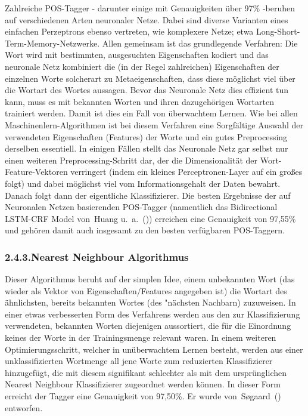 \documentclass{article}
\begin{document}
\noindent{}Zahlreiche POS-Tagger - darunter einige mit Genauigkeiten über 97\% -beruhen auf verschiedenen Arten neuronaler Netze. Dabei sind diverse Varianten eines einfachen Perzeptrons ebenso vertreten, wie komplexere Netze; etwa Long-Short-Term-Memory-Netzwerke.
Allen gemeinsam ist das grundlegende Verfahren: Die Wort wird mit bestimmten, ausgesuchten Eigenschaften kodiert und das neuronale Netz kombiniert die (in der Regel zahlreichen) Eigenschaften der einzelnen Worte solcherart zu Metaeigenschaften, dass diese möglichst viel über die Wortart des Wortes aussagen. Bevor das Neuronale Netz dies effizient tun kann, muss es mit bekannten Worten und ihren dazugehörigen Wortarten trainiert werden. Damit ist dies ein Fall von überwachtem Lernen.
Wie bei allen Maschinenlern-Algorithmen ist bei diesem Verfahren eine Sorgfältige Auswahl der verwendeten Eigenschaften (Features) der Worte und ein gutes Preprocessing derselben essentiell. In einigen Fällen stellt das Neuronale Netz gar selbst nur einen weiteren Preprocessing-Schritt dar, der die Dimensionalität der Wort-Feature-Vektoren verringert (indem ein kleines Perceptronen-Layer auf ein großes folgt) und dabei möglichst viel vom Informationsgehalt der Daten bewahrt. Danach folgt dann der eigentliche Klassifizierer.
Die besten Ergebnisse der auf Neuronalen Netzen basierenden POS-Tagger (namentlich das Bidirectional LSTM-CRF Model von~Huang u. a.~()) erreichen eine Genauigkeit von 97,55\% und gehören damit auch insgesamt zu den besten verfügbaren POS-Taggern.%

\subsubsection{2.4.3.\hspace*{0.5em}Nearest Neighbour Algorithmus}\label{sec-nearest-neighbour-algorithmus}%

\noindent{}Dieser Algorithmus beruht auf der simplen Idee, einem unbekannten Wort (das wieder als Vektor von Eigenschaften/Features angegeben ist) die Wortart des ähnlichsten, bereits bekannten Wortes (des "nächsten Nachbarn) zuzuweisen. In einer etwas verbesserten Form des Verfahrens werden aus den zur Klassifizierung verwendeten, bekannten Worten diejenigen aussortiert, die für die Einordnung keines der Worte in der Trainingsmenge relevant waren. In einem weiteren Optimierungsschritt, welcher in unüberwachtem Lernen besteht, werden aus einer unklassifizierten Wortmenge all jene Worte zum reduzierten Klassifizierer hinzugefügt, die mit diesem signifikant schlechter als mit dem ursprünglichen Nearest Neighbour Klassifizierer zugeordnet werden können.
In dieser Form erreicht der Tagger eine Genauigkeit von 97,50\%. Er wurde von~Søgaard~() entworfen.%
\end{document}
